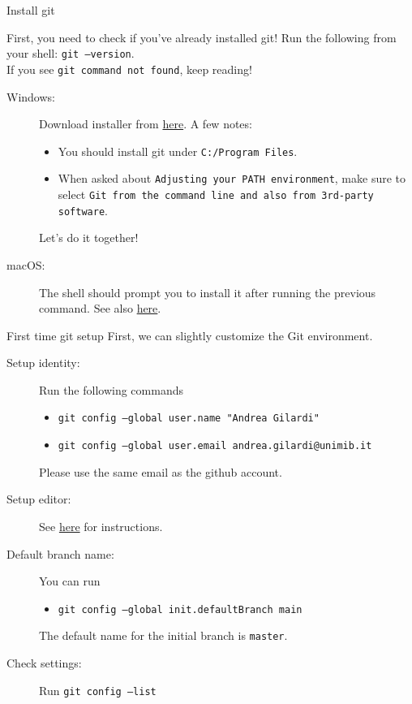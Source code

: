 \documentclass[
hyperref={bookmarks=false},
xcolor={dvipsnames,svgnames*,x11names*}, 
12pt
]{beamer}
\begin{document}
\setlength{\leftmarginii}{-1cm}

\begin{frame}{Install git}
\vspace{-0.5cm}

First, you need to check if you've already installed git! Run the following from your shell: \texttt{git --version}. \\
\vspace{1em}
If you see \texttt{git command not found}, keep reading! 

\begin{description}
\item[Windows: ] Download installer from \href{https://git-scm.com/download/win}{here}. A few notes: 
\begin{itemize}
\item You should install git under \texttt{C:/Program Files}.
\item When asked about \texttt{Adjusting your PATH environment}, make sure to select \texttt{Git from the command line and also from 3rd-party software}. 
\end{itemize}
\hspace{-1cm}Let's do it together! 
\item[macOS: ] The shell should prompt you to install it after running the previous command. See also \href{https://git-scm.com/download/mac}{here}. 
\end{description}
\end{frame}

\setlength{\leftmarginii}{-1.5cm}

\begin{frame}{First time git setup}
\vspace{-0.5cm}
First, we can slightly customize the Git environment. 
\begin{description}
\item[Setup identity:] Run the following commands
\begin{itemize}
\item \texttt{git config --global user.name "Andrea Gilardi"}
\item \texttt{git config --global user.email andrea.gilardi@unimib.it}
\end{itemize}
\hspace{-2cm} Please use the same email as the github account.
\item[Setup editor:] See \href{https://git-scm.com/book/en/v2/Appendix-C\%3A-Git-Commands-Setup-and-Config\#ch_core_editor}{here} for instructions. 
\item[Default branch name:] You can run 
\begin{itemize}
\item \texttt{git config --global init.defaultBranch main}
\end{itemize}  
\hspace{-2cm} The default name for the initial branch is \texttt{master}. 
\item[Check settings:] Run \texttt{git config --list}
\end{description}
\end{frame}
\end{document}
